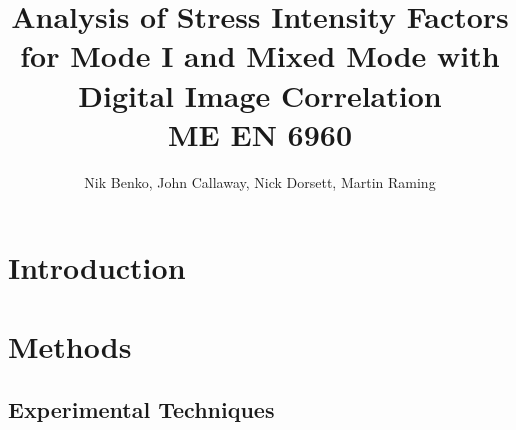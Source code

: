 \documentclass[12pt]{article}
\begin{document}
\title{ Analysis of Stress Intensity Factors for Mode I and Mixed Mode with Digital Image Correlation \\ \normalsize{ME EN 6960}}
\author{Nik Benko, John Callaway, Nick Dorsett, Martin Raming}
\maketitle


\begin{abstract} 

\end{abstract}

\section{Introduction} %


\section{Methods}

\subsection{Experimental Techniques} 
\end{document}
